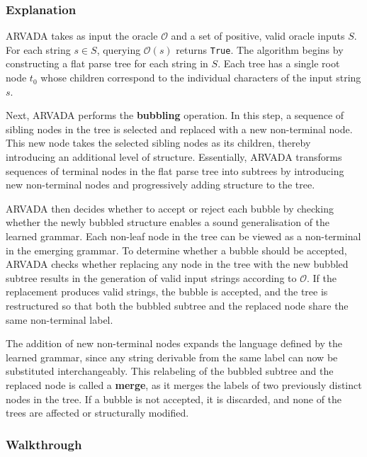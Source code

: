 \subsubsection{Explanation}

ARVADA takes as input the oracle $\mathcal{O}$ and a set of positive, valid oracle inputs $S$. For each string $s \in S$, querying $\mathcal{O}(s)$ returns \verb|True|. The algorithm begins by constructing a flat parse tree for each string in $S$. Each tree has a single root node $t_0$ whose children correspond to the individual characters of the input string $s$.

\vspace{\baselineskip}
Next, ARVADA performs the \textbf{bubbling} operation. In this step, a sequence of sibling nodes in the tree is selected and replaced with a new non-terminal node. This new node takes the selected sibling nodes as its children, thereby introducing an additional level of structure. Essentially, ARVADA transforms sequences of terminal nodes in the flat parse tree into subtrees by introducing new non-terminal nodes and progressively adding structure to the tree.

\vspace{\baselineskip}
ARVADA then decides whether to accept or reject each bubble by checking whether the newly bubbled structure enables a sound generalisation of the learned grammar. Each non-leaf node in the tree can be viewed as a non-terminal in the emerging grammar. To determine whether a bubble should be accepted, ARVADA checks whether replacing any node in the tree with the new bubbled subtree results in the generation of valid input strings according to $\mathcal{O}$. If the replacement produces valid strings, the bubble is accepted, and the tree is restructured so that both the bubbled subtree and the replaced node share the same non-terminal label.

\vspace{\baselineskip}
The addition of new non-terminal nodes expands the language defined by the learned grammar, since any string derivable from the same label can now be substituted interchangeably. This relabeling of the bubbled subtree and the replaced node is called a \textbf{merge}, as it merges the labels of two previously distinct nodes in the tree. If a bubble is not accepted, it is discarded, and none of the trees are affected or structurally modified.

\subsubsection{Walkthrough}

